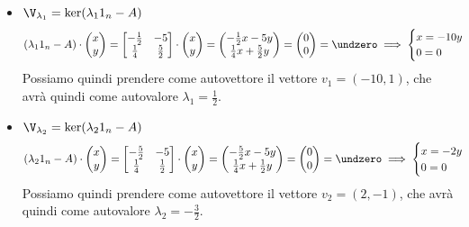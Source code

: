 \documentclass[11pt, a4paper, titlepage, oneside]{scrbook}
\begin{document}
\begin{itemize}
    \item $\V_{\lambda_1} = \ker(\lambda_1 1_n - A)$ \\
    \[
    (\lambda_1 1_n - A)  \cdot \begin{pmatrix}
        x \\ y
    \end{pmatrix} = \begin{bmatrix}
        -\frac{1}{2} & -5 \\
        \frac{1}{4} & \frac{5}{2}
    \end{bmatrix} \cdot \begin{pmatrix}
        x \\ y
    \end{pmatrix} = \begin{pmatrix}
        -\frac{1}{2}x  -5y \\
        \frac{1}{4}x + \frac{5}{2} y
    \end{pmatrix} = \begin{pmatrix}
        0 \\ 0
    \end{pmatrix} = \undzero
     \implies
     \begin{cases}
        x = -10y \\
        0 = 0
     \end{cases}
    \]
    Possiamo quindi prendere come autovettore il vettore $v_1 = (-10,1)$, che avrà quindi come autovalore $\lambda_1 = \frac{1}{2}$.
    \item $\V_{\lambda_2} = \ker(\lambda_2 1_n - A)$ \\
    \[
    (\lambda_2 1_n - A) \cdot \begin{pmatrix}
        x \\ y
    \end{pmatrix} = \begin{bmatrix}
        -\frac{5}{2} & - 5 \\
        \frac{1}{4} & \frac{1}{2}
    \end{bmatrix} \cdot \begin{pmatrix}
        x \\ y
    \end{pmatrix} = \begin{pmatrix}
        -\frac{5}{2} x - 5y \\
        \frac{1}{4} x + \frac{1}{2}y
    \end{pmatrix} = \begin{pmatrix}
         0 \\ 0
    \end{pmatrix} = \undzero
    \implies
    \begin{cases}
        x = -2y \\
        0 = 0 
    \end{cases}
    \]
    Possiamo quindi prendere come autovettore il vettore $v_2 = (2,-1)$, che avrà quindi come autovalore $\lambda_2 = -\frac{3}{2}$.
\end{itemize}
\end{document}
